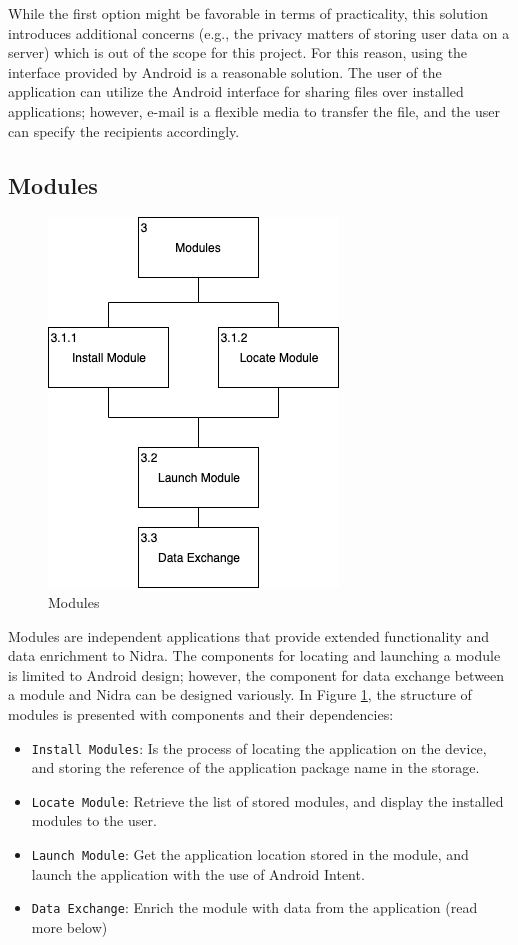 While the first option might be favorable in terms of practicality, this solution introduces additional concerns (e.g., the privacy matters of storing user data on a server) which is out of the scope for this project. For this reason, using the interface provided by Android is a reasonable solution. The user of the application can utilize the Android interface for sharing files over installed applications; however, e-mail is a flexible media to transfer the file, and the user can specify the recipients accordingly.  

\subsection{Modules}

\begin{figure}
    \centering
    \includegraphics[scale=0.6]{images/Modules.png}
    \caption{Modules}
    \label{fig:hta_modules}
\end{figure}

Modules are independent applications that provide extended functionality and data enrichment to Nidra. The components for locating and launching a module is limited to Android design; however, the component for data exchange between a module and Nidra can be designed variously.  In Figure \ref{fig:hta_modules}, the structure of modules is presented with components and their dependencies:   

\begin{itemize}
    \item[3.1.1] \verb|Install Modules|: Is the process of locating the application on the device, and storing the reference of the application package name in the storage.  
    \item[3.1.2] \verb|Locate Module|: Retrieve the list of stored modules, and display the installed modules to the user. 
    \item[3.2] \verb|Launch Module|: Get the application location stored in the module, and launch the application with the use of Android Intent. 
    \item[3.3] \verb|Data Exchange|: Enrich the module with data from the application (read more below)
\end{itemize}

